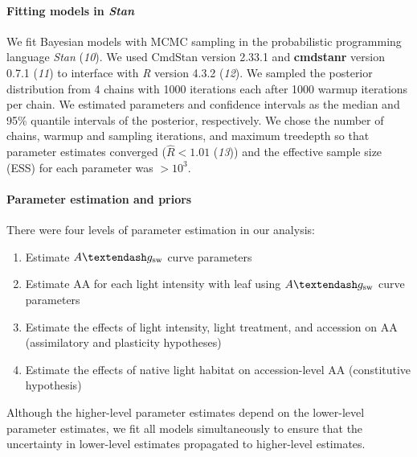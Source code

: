 \documentclass[
  letterpaper,
  DIV=11,
  numbers=noendperiod]{scrartcl}
\let\oldparagraph\paragraph
\renewcommand{\paragraph}[1]{\oldparagraph{#1}\mbox{}}
\providecommand{\tightlist}{%
  \setlength{\itemsep}{0pt}\setlength{\parskip}{0pt}}\usepackage{longtable,booktabs,array}
\newcommand{\aax}{$\mathrm{AA}$}
\newcommand{\agcurve}{$A \textendash g_\text{sw}$}
\begin{document}
\paragraph{\texorpdfstring{Fitting models in
\emph{Stan}}{Fitting models in Stan}}\label{fitting-models-in-stan}

We fit Bayesian models with MCMC sampling in the probabilistic
programming language \emph{Stan} (\emph{10}). We used CmdStan version
2.33.1 and \textbf{cmdstanr} version 0.7.1 (\emph{11}) to interface with
\emph{R} version 4.3.2 (\emph{12}). We sampled the posterior
distribution from 4 chains with 1000 iterations each after 1000 warmup
iterations per chain. We estimated parameters and confidence intervals
as the median and 95\% quantile intervals of the posterior,
respectively. We chose the number of chains, warmup and sampling
iterations, and maximum treedepth so that parameter estimates converged
(\(\hat{R} < 1.01\) (\emph{13})) and the effective sample size (ESS) for
each parameter was \(> 10^3\).

\paragraph{Parameter estimation and
priors}\label{parameter-estimation-and-priors}

There were four levels of parameter estimation in our analysis:

\begin{enumerate}
\def\labelenumi{\arabic{enumi}.}
\tightlist
\item
  Estimate \agcurve{} curve parameters
\item
  Estimate \aax{} for each light intensity with leaf using \agcurve{}
  curve parameters
\item
  Estimate the effects of light intensity, light treatment, and
  accession on \aax{} (assimilatory and plasticity hypotheses)
\item
  Estimate the effects of native light habitat on accession-level \aax{}
  (constitutive hypothesis)
\end{enumerate}

Although the higher-level parameter estimates depend on the lower-level
parameter estimates, we fit all models simultaneously to ensure that the
uncertainty in lower-level estimates propagated to higher-level
estimates.
\end{document}
